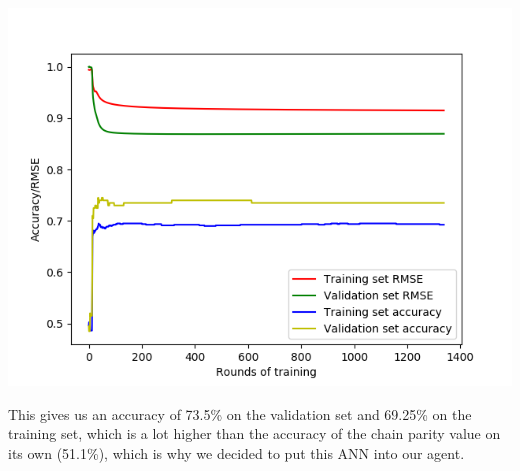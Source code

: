 \begin{center}
\includegraphics[scale=0.65]{images/ann_rmse+accuracy_(MCTS2_1000_games).png}
\end{center}

This gives us an accuracy of 73.5\% on the validation set and 69.25\% on the training set, which is a lot higher than the accuracy of the chain parity value on its own (51.1\%), which is why we decided to put this ANN into our agent.